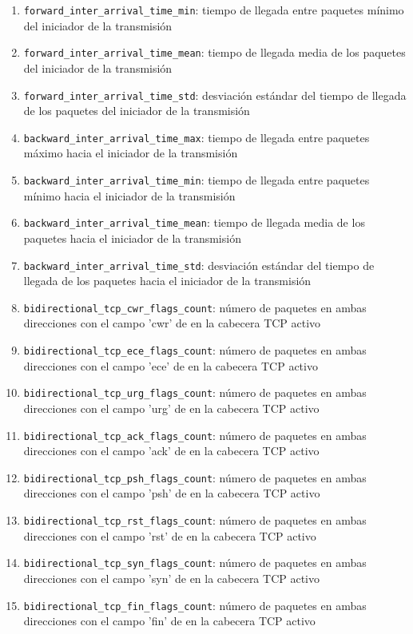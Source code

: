 \begin{enumerate}
  \item \texttt{forward\_inter\_arrival\_time\_min}: tiempo de llegada entre paquetes mínimo del iniciador de la transmisión
  \item \texttt{forward\_inter\_arrival\_time\_mean}: tiempo de llegada media de los paquetes del iniciador de la transmisión
  \item \texttt{forward\_inter\_arrival\_time\_std}: desviación estándar del tiempo de llegada de los paquetes del iniciador de la transmisión
  \item \texttt{backward\_inter\_arrival\_time\_max}: tiempo de llegada entre paquetes máximo hacia el iniciador de la transmisión
  \item \texttt{backward\_inter\_arrival\_time\_min}: tiempo de llegada entre paquetes mínimo hacia el iniciador de la transmisión
  \item \texttt{backward\_inter\_arrival\_time\_mean}: tiempo de llegada media de los paquetes hacia el iniciador de la transmisión 
  \item \texttt{backward\_inter\_arrival\_time\_std}: desviación estándar del tiempo de llegada de los paquetes hacia el iniciador de la transmisión
  \item \texttt{bidirectional\_tcp\_cwr\_flags\_count}: número de paquetes en ambas direcciones con el campo 'cwr' de en la cabecera TCP activo
  \item \texttt{bidirectional\_tcp\_ece\_flags\_count}: número de paquetes en ambas direcciones con el campo 'ece' de en la cabecera TCP activo
  \item \texttt{bidirectional\_tcp\_urg\_flags\_count}: número de paquetes en ambas direcciones con el campo 'urg' de en la cabecera TCP activo
  \item \texttt{bidirectional\_tcp\_ack\_flags\_count}: número de paquetes en ambas direcciones con el campo 'ack' de en la cabecera TCP activo
  \item \texttt{bidirectional\_tcp\_psh\_flags\_count}: número de paquetes en ambas direcciones con el campo 'psh' de en la cabecera TCP activo
  \item \texttt{bidirectional\_tcp\_rst\_flags\_count}: número de paquetes en ambas direcciones con el campo 'rst' de en la cabecera TCP activo
  \item \texttt{bidirectional\_tcp\_syn\_flags\_count}: número de paquetes en ambas direcciones con el campo 'syn' de en la cabecera TCP activo
  \item \texttt{bidirectional\_tcp\_fin\_flags\_count}: número de paquetes en ambas direcciones con el campo 'fin' de en la cabecera TCP activo

\end{enumerate}
